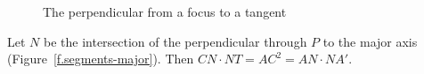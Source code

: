 \begin{figure}[t]
\begin{center}
\caption{The perpendicular from a focus to a tangent}\label{f.perp-focus-tangent}
\end{center}
\end{figure}


\begin{theorem}\label{thm.cnntacac}
Let $N$ be the intersection of the perpendicular through $P$ to the major axis (Figure~\ref{f.segments-major}). Then $CN\cdot NT = AC^2=AN\cdot NA'$.
\end{theorem}

